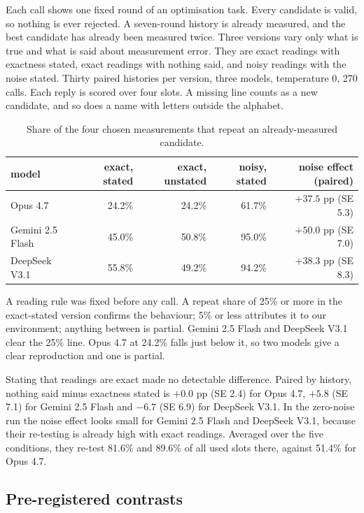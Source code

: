 Each call shows one fixed round of an optimisation task. Every candidate is valid, so nothing is ever rejected. A
seven-round history is already measured, and the best candidate has already been measured twice. Three versions vary only what is true and what is said about measurement error. They are exact readings with exactness stated, exact
readings with nothing said, and noisy readings with the noise stated. Thirty paired histories per version, three
models, temperature 0, 270 calls. Each reply is scored over four slots. A missing line counts as a new candidate, and so does a name with letters outside the alphabet.

\begin{table}[h]
\centering
\small
\caption{Share of the four chosen measurements that repeat an already-measured candidate.}
\begin{tabular}{lrrrr}
\toprule
model & exact, stated & exact, unstated & noisy, stated & noise effect (paired) \\
\midrule
Opus 4.7         & 24.2\% & 24.2\% & 61.7\% & $+37.5$ pp (SE 5.3) \\
Gemini 2.5 Flash & 45.0\% & 50.8\% & 95.0\% & $+50.0$ pp (SE 7.0) \\
DeepSeek V3.1    & 55.8\% & 49.2\% & 94.2\% & $+38.3$ pp (SE 8.3) \\
\bottomrule
\end{tabular}
\end{table}

A reading rule was fixed before any call. A repeat share of 25\% or more in the exact-stated version confirms
the behaviour; 5\% or less attributes it to our environment; anything between is partial.
Gemini 2.5 Flash and DeepSeek V3.1 clear the 25\% line. Opus 4.7 at 24.2\% falls just
below it, so two models give a clear reproduction and one is partial.

Stating that readings are exact made no detectable difference. Paired by history, nothing said minus exactness stated is $+0.0$ pp (SE 2.4) for Opus 4.7, $+5.8$ (SE 7.1) for Gemini 2.5 Flash and $-6.7$
(SE 6.9) for DeepSeek V3.1. In the zero-noise run the noise effect looks small for Gemini 2.5 Flash and DeepSeek V3.1, because their re-testing is already high with exact readings. Averaged over the five conditions, they re-test 81.6\% and 89.6\% of all used slots there, against 51.4\% for Opus 4.7.

\subsection{Pre-registered contrasts}

